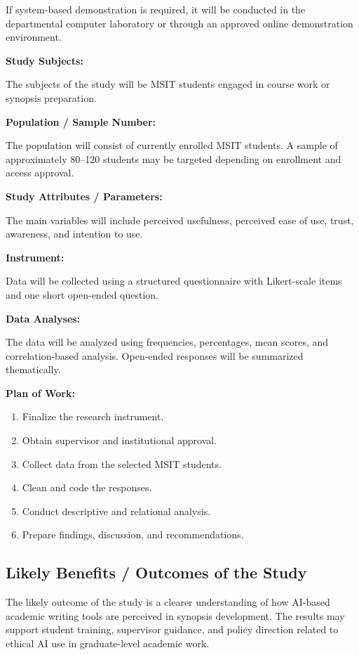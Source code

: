 \documentclass[11pt,a4paper]{article}
\begin{document}
If system-based demonstration is required, it will be conducted in the departmental computer laboratory or through an approved online demonstration environment.

\textbf{Study Subjects:}

The subjects of the study will be MSIT students engaged in course work or synopsis preparation.

\textbf{Population / Sample Number:}

The population will consist of currently enrolled MSIT students. A sample of approximately 80--120 students may be targeted depending on enrollment and access approval.

\textbf{Study Attributes / Parameters:}

The main variables will include perceived usefulness, perceived ease of use, trust, awareness, and intention to use.

\textbf{Instrument:}

Data will be collected using a structured questionnaire with Likert-scale items and one short open-ended question.

\textbf{Data Analyses:}

The data will be analyzed using frequencies, percentages, mean scores, and correlation-based analysis. Open-ended responses will be summarized thematically.

\textbf{Plan of Work:}

\begin{enumerate}[leftmargin=*]
  \item Finalize the research instrument.
  \item Obtain supervisor and institutional approval.
  \item Collect data from the selected MSIT students.
  \item Clean and code the responses.
  \item Conduct descriptive and relational analysis.
  \item Prepare findings, discussion, and recommendations.
\end{enumerate}

\subsection{Likely Benefits / Outcomes of the Study}

The likely outcome of the study is a clearer understanding of how AI-based academic writing tools are perceived in synopsis development. The results may support student training, supervisor guidance, and policy direction related to ethical AI use in graduate-level academic work.
\end{document}
